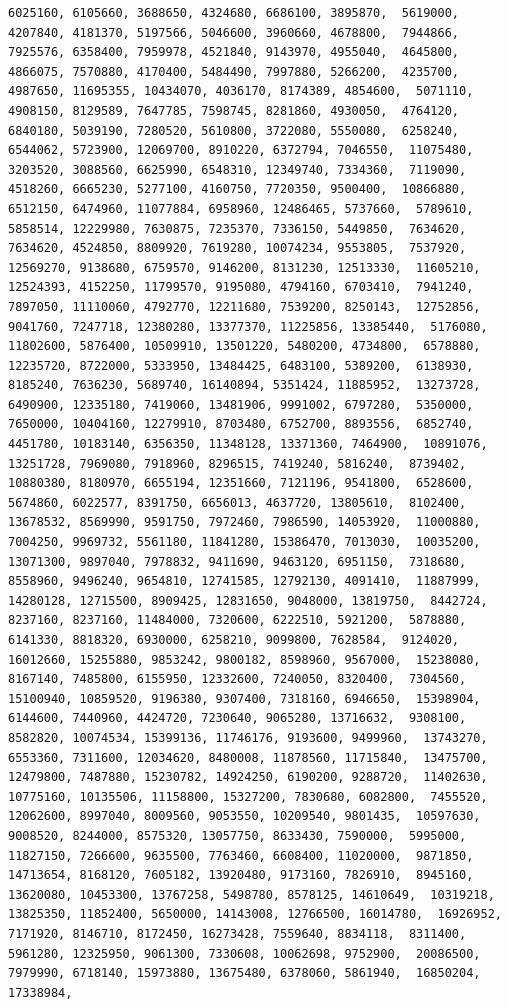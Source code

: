 \documentclass[
]{article}
\begin{document}
\begin{verbatim}
6025160, 6105660, 3688650, 4324680, 6686100, 3895870,  5619000, 4207840, 4181370, 5197566, 5046600, 3960660, 4678800,  7944866, 7925576, 6358400, 7959978, 4521840, 9143970, 4955040,  4645800, 4866075, 7570880, 4170400, 5484490, 7997880, 5266200,  4235700, 4987650, 11695355, 10434070, 4036170, 8174389, 4854600,  5071110, 4908150, 8129589, 7647785, 7598745, 8281860, 4930050,  4764120, 6840180, 5039190, 7280520, 5610800, 3722080, 5550080,  6258240, 6544062, 5723900, 12069700, 8910220, 6372794, 7046550,  11075480, 3203520, 3088560, 6625990, 6548310, 12349740, 7334360,  7119090, 4518260, 6665230, 5277100, 4160750, 7720350, 9500400,  10866880, 6512150, 6474960, 11077884, 6958960, 12486465, 5737660,  5789610, 5858514, 12229980, 7630875, 7235370, 7336150, 5449850,  7634620, 7634620, 4524850, 8809920, 7619280, 10074234, 9553805,  7537920, 12569270, 9138680, 6759570, 9146200, 8131230, 12513330,  11605210, 12524393, 4152250, 11799570, 9195080, 4794160, 6703410,  7941240, 7897050, 11110060, 4792770, 12211680, 7539200, 8250143,  12752856, 9041760, 7247718, 12380280, 13377370, 11225856, 13385440,  5176080, 11802600, 5876400, 10509910, 13501220, 5480200, 4734800,  6578880, 12235720, 8722000, 5333950, 13484425, 6483100, 5389200,  6138930, 8185240, 7636230, 5689740, 16140894, 5351424, 11885952,  13273728, 6490900, 12335180, 7419060, 13481906, 9991002, 6797280,  5350000, 7650000, 10404160, 12279910, 8703480, 6752700, 8893556,  6852740, 4451780, 10183140, 6356350, 11348128, 13371360, 7464900,  10891076, 13251728, 7969080, 7918960, 8296515, 7419240, 5816240,  8739402, 10880380, 8180970, 6655194, 12351660, 7121196, 9541800,  6528600, 5674860, 6022577, 8391750, 6656013, 4637720, 13805610,  8102400, 13678532, 8569990, 9591750, 7972460, 7986590, 14053920,  11000880, 7004250, 9969732, 5561180, 11841280, 15386470, 7013030,  10035200, 13071300, 9897040, 7978832, 9411690, 9463120, 6951150,  7318680, 8558960, 9496240, 9654810, 12741585, 12792130, 4091410,  11887999, 14280128, 12715500, 8909425, 12831650, 9048000, 13819750,  8442724, 8237160, 8237160, 11484000, 7320600, 6222510, 5921200,  5878880, 6141330, 8818320, 6930000, 6258210, 9099800, 7628584,  9124020, 16012660, 15255880, 9853242, 9800182, 8598960, 9567000,  15238080, 8167140, 7485800, 6155950, 12332600, 7240050, 8320400,  7304560, 15100940, 10859520, 9196380, 9307400, 7318160, 6946650,  15398904, 6144600, 7440960, 4424720, 7230640, 9065280, 13716632,  9308100, 8582820, 10074534, 15399136, 11746176, 9193600, 9499960,  13743270, 6553360, 7311600, 12034620, 8480008, 11878560, 11715840,  13475700, 12479800, 7487880, 15230782, 14924250, 6190200, 9288720,  11402630, 10775160, 10135506, 11158800, 15327200, 7830680, 6082800,  7455520, 12062600, 8997040, 8009560, 9053550, 10209540, 9801435,  10597630, 9008520, 8244000, 8575320, 13057750, 8633430, 7590000,  5995000, 11827150, 7266600, 9635500, 7763460, 6608400, 11020000,  9871850, 14713654, 8168120, 7605182, 13920480, 9173160, 7826910,  8945160, 13620080, 10453300, 13767258, 5498780, 8578125, 14610649,  10319218, 13825350, 11852400, 5650000, 14143008, 12766500, 16014780,  16926952, 7171920, 8146710, 8172450, 16273428, 7559640, 8834118,  8311400, 5961280, 12325950, 9061300, 7330608, 10062698, 9752900,  20086500, 7979990, 6718140, 15973880, 13675480, 6378060, 5861940,  16850204, 17338984, 
\end{verbatim}
\end{document}
